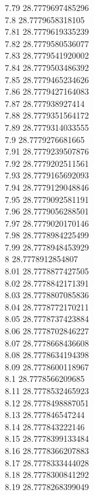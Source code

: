 {7.79	28.7779697485296\\
7.8	28.7779658318105\\
7.81	28.7779619335239\\
7.82	28.7779580536077\\
7.83	28.7779541920002\\
7.84	28.7779503486392\\
7.85	28.7779465234626\\
7.86	28.7779427164083\\
7.87	28.777938927414\\
7.88	28.7779351564172\\
7.89	28.7779314033555\\
7.9	28.7779276681665\\
7.91	28.7779239507876\\
7.92	28.7779202511561\\
7.93	28.7779165692093\\
7.94	28.7779129048846\\
7.95	28.7779092581191\\
7.96	28.7779056288501\\
7.97	28.7779020170146\\
7.98	28.7778984225499\\
7.99	28.7778948453929\\
8	28.7778912854807\\
8.01	28.7778877427505\\
8.02	28.7778842171391\\
8.03	28.7778807085836\\
8.04	28.7778772170211\\
8.05	28.7778737423884\\
8.06	28.7778702846227\\
8.07	28.7778668436608\\
8.08	28.7778634194398\\
8.09	28.7778600118967\\
8.1	28.7778566209685\\
8.11	28.7778532465923\\
8.12	28.7778498887051\\
8.13	28.777846547244\\
8.14	28.777843222146\\
8.15	28.7778399133484\\
8.16	28.7778366207883\\
8.17	28.7778333444028\\
8.18	28.7778300841292\\
8.19	28.7778268399049\\
}

